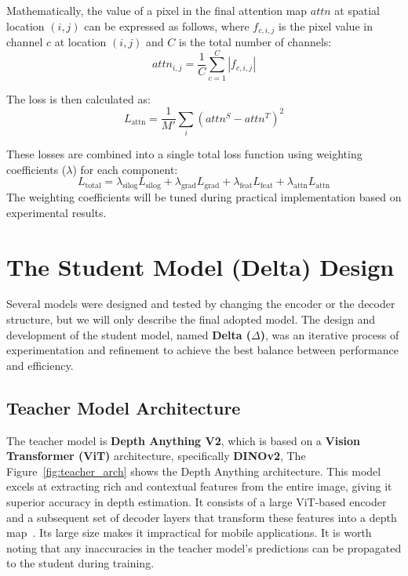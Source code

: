 \begin{enumerate}
    Mathematically, the value of a pixel in the final attention map $attn$ at spatial location $(i,j)$ can be expressed as follows, where $f_{c,i,j}$ is the pixel value in channel $c$ at location $(i,j)$ and $C$ is the total number of channels:
    \begin{equation}
        attn_{i,j} = \frac{1}{C}\sum_{c=1}^{C}|f_{c,i,j}|
    \end{equation}
    
    The loss is then calculated as:
    \begin{equation}
        L_{\text{attn}} = \frac{1}{M'}\sum_{i}(attn^S - attn^T)^2
        \label{eq:attn_loss}
    \end{equation}
\end{enumerate}

These losses are combined into a single total loss function using weighting coefficients ($\lambda$) for each component:
\begin{equation}
    L_{\text{total}} = \lambda_{\text{silog}}L_{\text{silog}} + \lambda_{\text{grad}}L_{\text{grad}} + \lambda_{\text{feat}}L_{\text{feat}} + \lambda_{\text{attn}}L_{\text{attn}}
    \label{eq:total_loss}
\end{equation}
The weighting coefficients will be tuned during practical implementation based on experimental results.

\section{The Student Model (Delta) Design}
\label{sec:delta_model_design}

Several models were designed and tested by changing the encoder or the decoder structure, but we will only describe the final adopted model. The design and development of the student model, named \textbf{Delta ($\Delta$)}, was an iterative process of experimentation and refinement to achieve the best balance between performance and efficiency.

\subsection{Teacher Model Architecture}
\label{subsec:teacher_arch}

The teacher model is \textbf{Depth Anything V2}, which is based on a \textbf{Vision Transformer (ViT)} architecture, specifically \textbf{DINOv2}, The Figure~\ref{fig:teacher_arch} shows the Depth Anything architecture. This model excels at extracting rich and contextual features from the entire image, giving it superior accuracy in depth estimation. It consists of a large ViT-based encoder and a subsequent set of decoder layers that transform these features into a depth map~\cite{yang2024depth,yang2024depthV2}. Its large size makes it impractical for mobile applications. It is worth noting that any inaccuracies in the teacher model's predictions can be propagated to the student during training.

